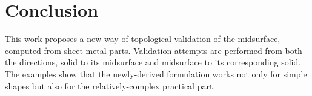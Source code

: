 \section{Conclusion}
This work proposes a new way of topological validation of the midsurface, computed from sheet metal parts. Validation attempts are performed from both the directions, solid to its midsurface and midsurface to its corresponding solid. The examples show that the newly-derived formulation works not only for simple shapes but also for the relatively-complex practical part.
